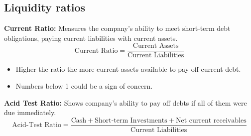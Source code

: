 \subsection{Liquidity ratios}
\begin{definition}

    \textbf{Current Ratio:} Measures the company's ability to meet short-term debt obligations, paying current liabilities with current assets.
    \begin{equation}
        \text{Current Ratio} = \frac{\text{Current Assets}}{\text{Current Liabilities}}
    \end{equation}
    \begin{itemize}
        \item Higher the ratio the more current assets available to pay off current debt.
        \item Numbers below 1 could be a sign of concern.
    \end{itemize}
    \vspace{1em}
    \textbf{Acid Test Ratio:} Shows company's ability to pay off debts if all of them were due immediately.
    \begin{equation}
        \text{Acid-Test Ratio} = \frac{\text{Cash} + \text{Short-term Investments} + \text{Net current receivables}}{\text{Current Liabilities}}
    \end{equation}
\end{definition}

